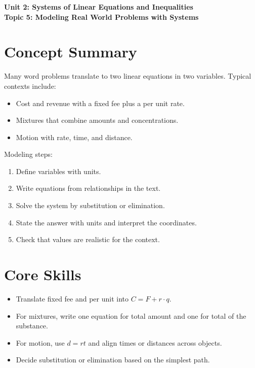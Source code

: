\documentclass[12pt]{article}
\begin{document}
\begin{center}
    \LARGE \textbf{Unit 2: Systems of Linear Equations and Inequalities} \\[6pt]
    \Large \textbf{Topic 5: Modeling Real World Problems with Systems}
\end{center}

\vspace{1em}

\section*{Concept Summary}

Many word problems translate to two linear equations in two variables. Typical contexts include:
\begin{itemize}
  \item Cost and revenue with a fixed fee plus a per unit rate.
  \item Mixtures that combine amounts and concentrations.
  \item Motion with rate, time, and distance.
\end{itemize}

Modeling steps:
\begin{enumerate}
  \item Define variables with units.
  \item Write equations from relationships in the text.
  \item Solve the system by substitution or elimination.
  \item State the answer with units and interpret the coordinates.
  \item Check that values are realistic for the context.
\end{enumerate}

\section*{Core Skills}
\begin{itemize}
  \item Translate fixed fee and per unit into \(C = F + r\cdot q\).
  \item For mixtures, write one equation for total amount and one for total of the substance.
  \item For motion, use \(d = rt\) and align times or distances across objects.
  \item Decide substitution or elimination based on the simplest path.
\end{itemize}
\end{document}
